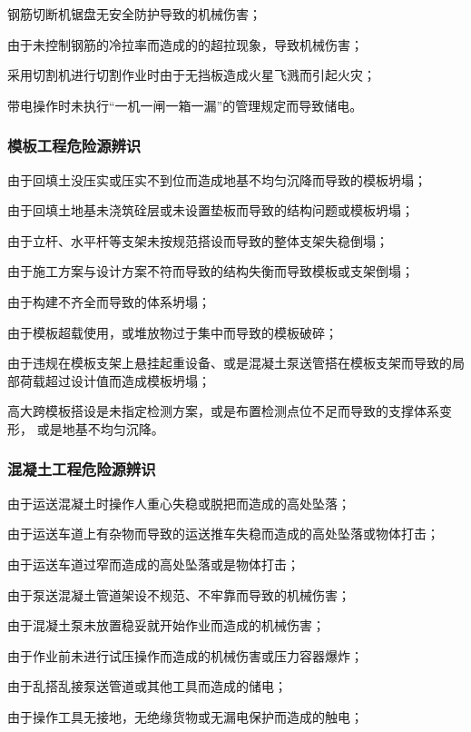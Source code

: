  钢筋切断机锯盘无安全防护导致的机械伤害；

 由于未控制钢筋的冷拉率而造成的的超拉现象，导致机械伤害；

 采用切割机进行切割作业时由于无挡板造成火星飞溅而引起火灾；

 带电操作时未执行“一机一闸一箱一漏”的管理规定而导致储电。

\subsubsection{模板工程危险源辨识}

 由于回填土没压实或压实不到位而造成地基不均匀沉降而导致的模板坍塌；

 由于回填土地基未浇筑硂层或未设置垫板而导致的结构问题或模板坍塌；

 由于立杆、水平杆等支架未按规范搭设而导致的整体支架失稳倒塌；

 由于施工方案与设计方案不符而导致的结构失衡而导致模板或支架倒塌；

 由于构建不齐全而导致的体系坍塌；

 由于模板超载使用，或堆放物过于集中而导致的模板破碎；

 由于违规在模板支架上悬挂起重设备、或是混凝土泵送管搭在模板支架而导致的局部荷载超过设计值而造成模板坍塌；

 高大跨模板搭设是未指定检测方案，或是布置检测点位不足而导致的支撑体系变形，
或是地基不均匀沉降。

\subsubsection{混凝土工程危险源辨识}

 由于运送混凝土时操作人重心失稳或脱把而造成的高处坠落；

 由于运送车道上有杂物而导致的运送推车失稳而造成的高处坠落或物体打击；

 由于运送车道过窄而造成的高处坠落或是物体打击；

 由于泵送混凝土管道架设不规范、不牢靠而导致的机械伤害；

 由于混凝土泵未放置稳妥就开始作业而造成的机械伤害；

 由于作业前未进行试压操作而造成的机械伤害或压力容器爆炸；

 由于乱搭乱接泵送管道或其他工具而造成的储电；

 由于操作工具无接地，无绝缘货物或无漏电保护而造成的触电；


